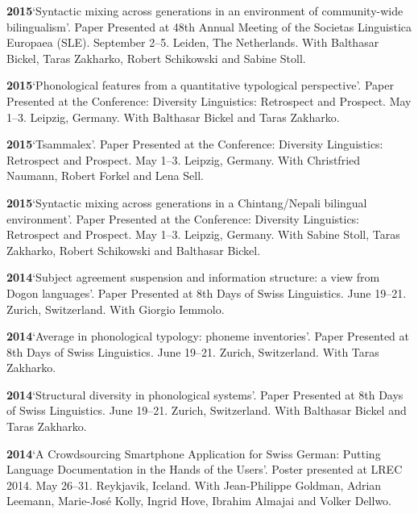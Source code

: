 \documentclass[11pt]{article}
\newcommand{\hangpara}{
 \setlength{\parindent}{0in} %
 \hangindent=0.42in %
}
\begin{document}
\vskip 6pt
\hangpara
{\bf 2015}\hspace{1ex}`Syntactic mixing across generations in an environment of community-wide bilingualism'. Paper Presented at 48th Annual Meeting of the Societas Linguistica Europaea (SLE). September 2--5. Leiden, The Netherlands. With Balthasar Bickel, Taras Zakharko, Robert Schikowski and Sabine Stoll.

\vskip 6pt
\hangpara
{\bf 2015}\hspace{1ex}`Phonological features from a quantitative typological perspective'. Paper Presented at the Conference: Diversity Linguistics: Retrospect and Prospect. May 1--3. Leipzig, Germany. With Balthasar Bickel and Taras Zakharko.

\vskip 6pt
\hangpara
{\bf 2015}\hspace{1ex}`Tsammalex'. Paper Presented at the Conference: Diversity Linguistics: Retrospect and Prospect. May 1--3. Leipzig, Germany. With Christfried Naumann, Robert Forkel and Lena Sell.

\vskip 6pt
\hangpara
{\bf 2015}\hspace{1ex}`Syntactic mixing across generations in a Chintang/Nepali bilingual environment'. Paper Presented at the Conference: Diversity Linguistics: Retrospect and Prospect. May 1--3. Leipzig, Germany. With Sabine Stoll, Taras Zakharko, Robert Schikowski and Balthasar Bickel.

\vskip 6pt
\hangpara
{\bf 2014}\hspace{1ex}`Subject agreement suspension and information structure: a view from Dogon languages'. Paper Presented at 8th Days of Swiss Linguistics. June 19--21. Zurich, Switzerland. With Giorgio Iemmolo.

\vskip 6pt
\hangpara
{\bf 2014}\hspace{1ex}`Average in phonological typology: phoneme inventories'. Paper Presented at 8th Days of Swiss Linguistics. June 19--21. Zurich, Switzerland. With Taras Zakharko.

\vskip 6pt
\hangpara
{\bf 2014}\hspace{1ex}`Structural diversity in phonological systems'. Paper Presented at 8th Days of Swiss Linguistics. June 19--21. Zurich, Switzerland. With Balthasar Bickel and Taras Zakharko.

\vskip 6pt
\hangpara
{\bf 2014}\hspace{1ex}`A Crowdsourcing Smartphone Application for Swiss German: Putting Language Documentation in the Hands of the Users'. Poster presented at LREC 2014. May 26--31. Reykjavik, Iceland. With Jean-Philippe Goldman, Adrian Leemann, Marie-Jos{\'e} Kolly, Ingrid Hove, Ibrahim Almajai and Volker Dellwo.
\end{document}
